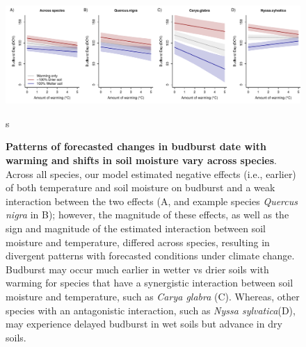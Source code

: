 \documentclass{article}
\begin{document}
 \begin{figure}[h]
\centering
 \includegraphics{../../Analyses/soilmoisture/figures/tempforecast_bb_0_5_135_28_105_4_degwarm.pdf}
 
 \caption{\textbf{Patterns of forecasted changes in budburst date with warming and shifts in soil moisture vary across species}. Across all species, our model estimated negative effects (i.e., earlier) of both temperature and soil moisture on budburst and a weak interaction between the two effects (A, and example species \textit{Quercus nigra} in B); however, the magnitude of these effects, as well as the sign and magnitude of the estimated interaction between soil moisture and temperature, differed across species, resulting in divergent patterns with forecasted conditions under climate change. Budburst may occur much earlier in wetter vs drier soils with warming for species that have a synergistic interaction between soil moisture and temperature, such as \textit{Carya glabra} (C). Whereas, other species with an antagonistic interaction, such as \textit{Nyssa sylvatica}(D), may experience delayed budburst in wet soils but advance in dry soils.}s
 \label{fig:bbsp}
 \end{figure}

\end{document}
